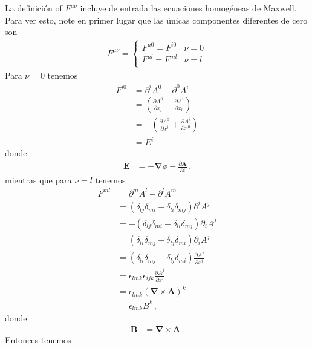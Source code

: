 La  definición of $F^{\mu\nu}$ incluye de entrada las ecuaciones
homogéneas de Maxwell. Para ver esto, note en primer lugar que las
únicas componentes diferentes de  cero son
\begin{align}
  F^{\mu\nu}=  \begin{cases}
    F^{\mu0}=F^{i0} & \text{$\nu=0$}\\
    F^{\mu l}=F^{ml} & \text{$\nu=l$}\\
  \end{cases}
\end{align}
Para $\nu=0$ tenemos
\begin{align}
F^{i0}  &=\partial^{i}A^0-\partial^0 A^{i}\nonumber\\
  &=(\frac{\partial A^0}{\partial x_i}-\frac{\partial A^{i}}{\partial x_0})\nonumber\\
&=-(\frac{\partial A^0}{\partial x^{i}}+\frac{\partial A^{i}}{\partial x^0})\nonumber\\
&=E^i
\end{align}
donde
\begin{align}
\label{eq:173qft}
   \mathbf{E}&=-\boldsymbol{\nabla}\phi-\frac{\partial\mathbf{A}}{\partial t}\,.
\end{align}
mientras que para $\nu=l$ tenemos
\begin{align}
F^{ml}  &=\partial^m A^l-\partial^l A^m\nonumber\\
  &=(\delta_{lj}\delta_{mi}-\delta_{li}\delta_{mj}){\partial^iA^j}\nonumber\\
  &=-(\delta_{lj}\delta_{mi}-\delta_{li}\delta_{mj}){\partial_iA^j}\nonumber\\
  &=(\delta_{li}\delta_{mj}-\delta_{lj}\delta_{mi}){\partial_iA^j}\nonumber\\
  &=(\delta_{li}\delta_{mj}-\delta_{lj}\delta_{mi})\frac{\partial A^j}{\partial x^{i}}\nonumber\\
    &=\epsilon_{lmk}\epsilon_{ijk}\frac{\partial A^j}{\partial x^{i}}\nonumber\\
&=\epsilon_{lmk}\left(\boldsymbol{\nabla}\times  \mathbf{A}\right)^k\nonumber\\
&=\epsilon_{lmk}B^k\,,
\end{align}
donde
\begin{align}
\label{eq:174qft}
  \mathbf{B}&=\boldsymbol{\nabla}\times \mathbf{A}\,.
\end{align}
Entonces tenemos
